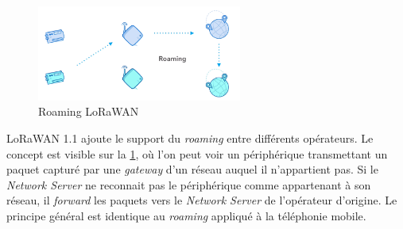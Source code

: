 \begin{figure}[ht!]
    \centering
    \includegraphics[width=0.6\textwidth]{Figures/Protocols/LoRaWAN/lorawan_roaming.png}
    \caption{Roaming LoRaWAN}
    \label{fig-lorawan_roaming}
\end{figure}

LoRaWAN 1.1 ajoute le support du \textit{roaming} entre différents opérateurs. Le concept est visible sur la \cref{fig-lorawan_roaming}, où l'on peut voir un périphérique transmettant un paquet capturé par une \textit{gateway} d'un réseau auquel il n'appartient pas. Si le \textit{Network Server} ne reconnait pas le périphérique comme appartenant à son réseau, il \textit{forward} les paquets vers le \textit{Network Server} de l'opérateur d'origine. Le principe général est identique au \textit{roaming} appliqué à la téléphonie mobile.

